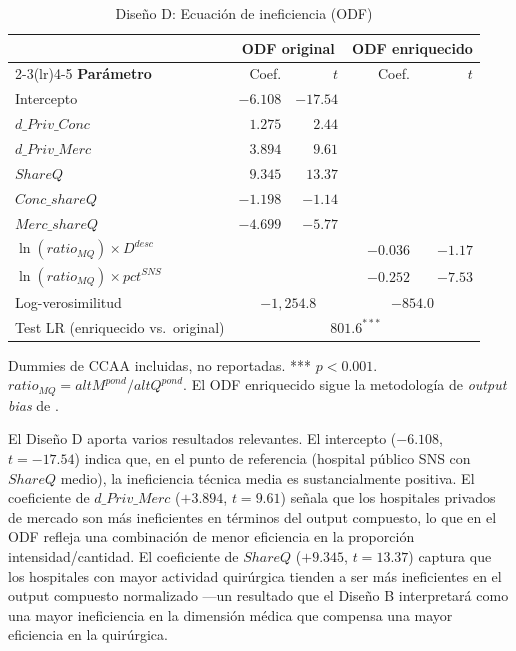 \documentclass[12pt, a4paper, twoside, openright]{book}
\theoremstyle{plain}
\theoremstyle{definition}
\theoremstyle{remark}
\begin{document}
\begin{table}[htbp]
\centering
\caption{Diseño D: Ecuación de ineficiencia (ODF)}
\label{tab:odf}
\begin{threeparttable}
\begin{tabular}{lrrrr}
\toprule
& \multicolumn{2}{c}{\textbf{ODF original}}
& \multicolumn{2}{c}{\textbf{ODF enriquecido}} \\
\cmidrule(lr){2-3}\cmidrule(lr){4-5}
\textbf{Parámetro} & Coef. & $t$ & Coef. & $t$ \\
\midrule
Intercepto & $-6.108$ & $-17.54$ & & \\
$d\_Priv\_Conc$ & $1.275$ & $2.44$ & & \\
$d\_Priv\_Merc$ & $3.894$ & $9.61$ & & \\
$ShareQ$ & $9.345$ & $13.37$ & & \\
$Conc\_shareQ$ & $-1.198$ & $-1.14$ & & \\
$Merc\_shareQ$ & $-4.699$ & $-5.77$ & & \\
$\ln(ratio_{MQ}) \times D^{desc}$ & & & $-0.036$ & $-1.17$ \\
$\ln(ratio_{MQ}) \times pct^{SNS}$ & & & $-0.252$ & $-7.53$ \\
\midrule
Log-verosimilitud & \multicolumn{2}{c}{$-1{,}254.8$}
  & \multicolumn{2}{c}{$-854.0$} \\
Test LR (enriquecido vs.\ original) & \multicolumn{4}{c}{$801.6^{***}$} \\
\bottomrule
\end{tabular}
\begin{tablenotes}
  \small
  \item Dummies de CCAA incluidas, no reportadas. *** $p<0.001$. $ratio_{MQ} = altM^{pond}/altQ^{pond}$. El ODF enriquecido sigue la metodología de \textit{output bias} de \citet{kumbhakar2015}.
\end{tablenotes}
\end{threeparttable}
\end{table}

El Diseño D aporta varios resultados relevantes. El intercepto ($-6.108$, $t=-17.54$) indica que, en el punto de referencia (hospital público SNS con $ShareQ$ medio), la ineficiencia técnica media es sustancialmente positiva. El coeficiente de $d\_Priv\_Merc$ ($+3.894$, $t=9.61$) señala que los hospitales privados de mercado son más ineficientes en términos del output compuesto, lo que en el ODF refleja una combinación de menor eficiencia en la proporción intensidad/cantidad. El coeficiente de $ShareQ$ ($+9.345$, $t=13.37$) captura que los hospitales con mayor actividad quirúrgica tienden a ser más ineficientes en el output compuesto normalizado ---un resultado que el Diseño B interpretará como una mayor ineficiencia en la dimensión médica que compensa una mayor eficiencia en la quirúrgica.
\end{document}
